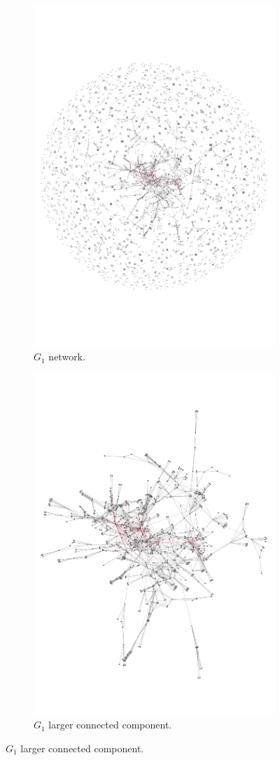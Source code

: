 \documentclass{article}
\theoremstyle{definition}
\begin{document}
\begin{figure}[!hbtp]
    \begin{subfigure}{.45\textwidth}\centering
        \includegraphics[width=.54\textwidth]{./assets/pd_network.pdf}
        \caption{\(G_1\) network.}\label{fig:g_one_network}
    \end{subfigure}
    \begin{subfigure}{.45\textwidth}\centering
        \includegraphics[width=.54\textwidth]{./assets/pd_network_cluster.pdf}
        \caption{\(G_1\) larger connected component.}\label{fig:g_one_cluster}
     \end{subfigure}
     

\end{figure}
\end{document}
